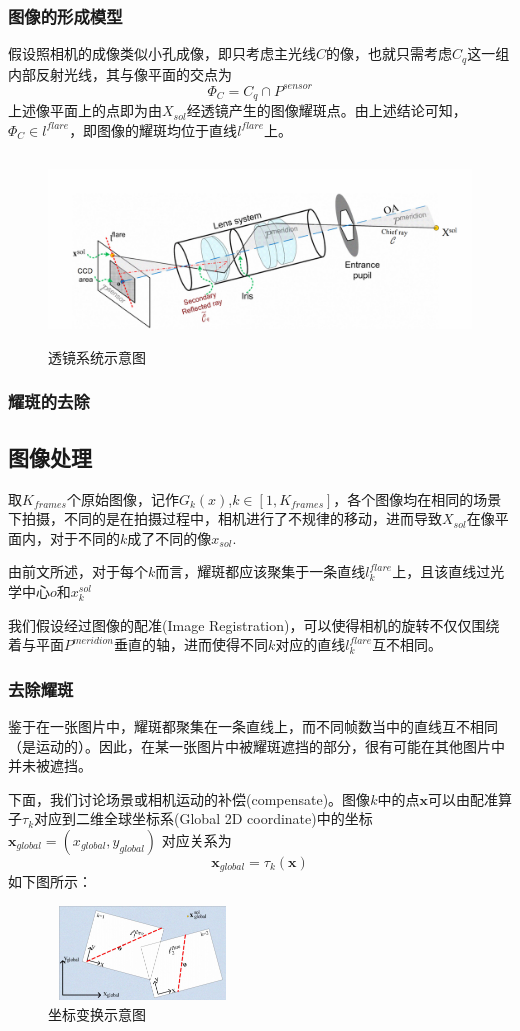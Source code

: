 \documentclass{beamer}
\begin{document}
\begin{frame}
\frametitle{图像的形成模型}
假设照相机的成像类似小孔成像，即只考虑主光线$C$的像，也就只需考虑${C_q}$这一组内部反射光线，其与像平面的交点为
\begin{equation}
\Phi_{C}={C_q}\cap P^{sensor}
\end{equation}\pause
上述像平面上的点即为由$X_{sol}$经透镜产生的图像耀斑点。由上述结论可知，$\Phi_C\in l^{flare}$，即图像的耀斑均位于直线$l^{flare}$上。\pause
\begin{figure}[!h]
\centering
\includegraphics[height=5cm,width=12cm]{20221202.png}
\caption{透镜系统示意图}
\end{figure}
\end{frame}
\begin{frame}
\frametitle{耀斑的去除}
\subsection{图像处理}
取$K_{frames}$个原始图像，记作$G_k(x)$,$k\in[1,K_{frames}]$，各个图像均在相同的场景下拍摄，不同的是在拍摄过程中，相机进行了不规律的移动，进而导致$X_{sol}$在像平面内，对于不同的$k$成了不同的像$x_{sol}$.\pause

由前文所述，对于每个$k$而言，耀斑都应该聚集于一条直线$l^{flare}_k$上，且该直线过光学中心$o$和$x^{sol}_k$\pause

我们假设经过图像的配准(Image Registration)，可以使得相机的旋转不仅仅围绕着与平面$P^{meridion}$垂直的轴，进而使得不同$k$对应的直线$l^{flare}_k$互不相同。
\end{frame}
\begin{frame}
\frametitle{去除耀斑}
鉴于在一张图片中，耀斑都聚集在一条直线上，而不同帧数当中的直线互不相同（是运动的）。因此，在某一张图片中被耀斑遮挡的部分，很有可能在其他图片中并未被遮挡。\pause

下面，我们讨论场景或相机运动的补偿(compensate)。图像$k$中的点$\textbf{x}$可以由配准算子$\tau_k$对应到二维全球坐标系(Global 2D coordinate)中的坐标$\textbf{x}_{global}=(x_{global},y_{global})$
对应关系为
\begin{equation}
\textbf{x}_{global}=\tau_k(\textbf{x})
\end{equation}  
如下图所示：
\begin{figure}[!h]
\centering
\includegraphics[height=2.5cm,width=5cm]{20221205.png}
\caption{坐标变换示意图}
\end{figure}
\end{frame}    
\end{document}
